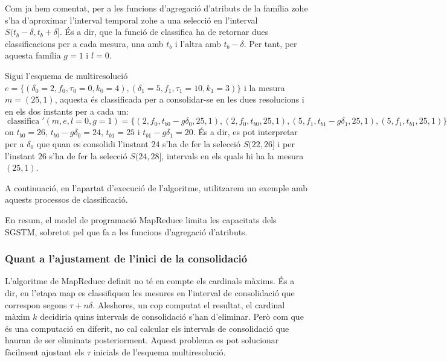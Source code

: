 \begin{example}
  \label{ex:mapreduce:fzohe} 
  Com ja hem comentat, per a les funcions d'agregació d'atributs de la
  família \gls{zohe} s'ha d'aproximar l'interval temporal \gls{zohe} a
  una selecció en l'interval $S(t_b-\delta,t_b+\delta]$. És a dir, que
  la funció de classifica ha de retornar dues classificacions per a
  cada mesura, una amb $t_b$ i l'altra amb $t_b-\delta$. Per tant, per
  aquesta família $g=1$ i $l=0$.

  Sigui l'esquema de multiresolució
  $e=\{(\delta_0=2,f_0,\tau_0=0,k_0=4),(\delta_1=5,f_1,\tau_1=10,k_1=3)\}$
  i la mesura $m=(25,1)$, aquesta és classificada per a consolidar-se
  en les dues resolucions i en els dos instants per a cada un:
  $\operatorname{classifica}'(m,e,l=0,g=1)=\{
  (2,f_0,t_{b0}-g\delta_0,25,1), (2,f_0,t_{b0},25,1),
  (5,f_1,t_{b1}-g\delta_1,25,1), (5,f_1,t_{b1},25,1) \}$ on $t_{b0}=
  26$, $t_{b0}-g\delta_0= 24$, $t_{b1}= 25$ i $t_{b1}-g\delta_1= 20$.
  És a dir, es pot interpretar per a $\delta_0$ que quan es consolidi
  l'instant $24$ s'ha de fer la selecció $S(22,26]$ i per l'instant
  $26$ s'ha de fer la selecció $S(24,28]$, intervals en els quals hi
  ha la mesura $(25,1)$.

  A continuació, en l'apartat d'execució de l'algoritme, utilitzarem un exemple
  amb aquests processos de classificació.
\end{example}






En resum, el model de programació MapReduce limita les capacitats dels
\gls{SGSTM}, sobretot pel que fa a les funcions d'agregació
d'atributs. 



\subsubsection{Quant a l'ajustament de l'inici de la consolidació}

L'algoritme de MapReduce definit no té en compte els cardinals màxims.
És a dir, en l'etapa map es classifiquen les mesures en l'interval de
consolidació que correspon segons $\tau+n\delta$.  Aleshores, un cop
computat el resultat, el cardinal màxim $k$ decidiria quins intervals
de consolidació s'han d'eliminar.  Però com que és una computació en
diferit, no cal calcular els intervals de consolidació que hauran de
ser eliminats posteriorment.  Aquest problema es pot solucionar
fàcilment ajustant els $\tau$ inicials de l'esquema multiresolució.


